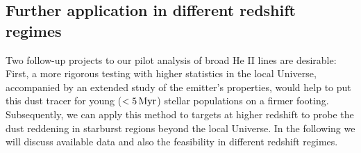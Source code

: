 \documentclass[]{aastex63}
\begin{document}

\subsection{Further application in different redshift regimes}
Two follow-up projects to our pilot analysis of broad He II lines are desirable: 
First, a more rigorous testing with higher statistics in the local Universe, accompanied by an extended study of the emitter's properties, would help to put this dust tracer for young ($<5\,{\rm Myr}$) stellar populations on a firmer footing. Subsequently, we can apply this method to targets at higher redshift to probe the dust reddening in starburst regions beyond the local Universe.  
In the following we will discuss available data and also the feasibility in different redshift regimes.
\end{document}
